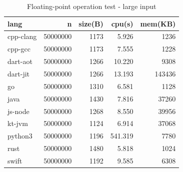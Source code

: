 \begin{table}[ht]
    \caption{Floating-point operation test - large input}
    \label{tab:n-body-1}
    \begin{center}
        \begin{tabular}{lrrrr}
            \toprule
            lang      & n        & size(B) & cpu(s)  & mem(KB) \\
            \midrule
            cpp-clang & 50000000 & 1173    & 5.926   & 1236    \\
            cpp-gcc   & 50000000 & 1173    & 7.555   & 1228    \\
            dart-aot  & 50000000 & 1266    & 10.220  & 9308    \\
            dart-jit  & 50000000 & 1266    & 13.193  & 143436  \\
            go        & 50000000 & 1310    & 6.581   & 1128    \\
            java      & 50000000 & 1430    & 7.816   & 37260   \\
            js-node   & 50000000 & 1268    & 8.550   & 39956   \\
            kt-jvm    & 50000000 & 1124    & 6.914   & 37068   \\
            python3   & 50000000 & 1196    & 541.319 & 7780    \\
            rust      & 50000000 & 1480    & 5.818   & 1024    \\
            swift     & 50000000 & 1192    & 9.585   & 6308    \\
            \bottomrule
        \end{tabular}
    \end{center}
\end{table}


